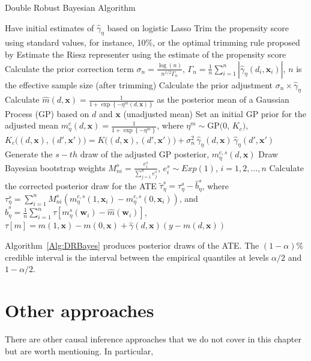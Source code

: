 \begin{algorithm}[h!]
	\caption{Double Robust Bayesian Algorithm}\label{Alg:DRBayes}
	\begin{algorithmic}[1]
		\State Have initial estimates of $\hat{\gamma}_{\eta}$ based on logistic Lasso
		\State Trim the propensity score using standard values, for instance, 10\%, or the optimal trimming rule proposed by \cite{Crump2009Overlap}
		\State Estimate the Riesz representer using the estimate of the propensity score 
		\State Calculate the prior correction term $\sigma_n=\frac{\log(n)}{n^{1/2}\Gamma_n}$, $\Gamma_n=\frac{1}{n}\sum_{i=1}^n |\hat{\gamma}_{\eta}(d_i,\mathbf{x}_i)|$, $n$ is the effective sample size (after trimming)
		\State Calculate the prior adjustment $\sigma_n\times \hat{\gamma}_{\eta}$ 
		\State Calculate $\hat{m}(d,\mathbf{x})=\frac{1}{1+\exp\left\{-\eta^m(d,\mathbf{x})\right\}}$ as the posterior mean of a Gaussian Process (GP) based on $d$ and $\mathbf{x}$ (unadjusted mean)
		\State Set an initial GP prior for  the adjusted mean $m_{\eta}^c(d,\mathbf{x})=\frac{1}{1+\exp\left\{-\eta^m\right\}}$, where $\eta^m \sim \mathrm{GP}\!\big(0,\, K_c\big)$, $K_c\big((d,\mathbf{x}),(d',\mathbf{x}')\big)
		= K\big((d,\mathbf{x}),(d',\mathbf{x}')\big)
		+ \sigma_n^2\,\widehat{\gamma}_\eta(d,\mathbf{x})\,
		\widehat{\gamma}_\eta(d',\mathbf{x}')$ 		 			
		\State Generate the $s-th$ draw of the adjusted GP posterior, $m_{\eta}^{c,s}(d,\mathbf{x})$
		\State Draw Bayesian bootstrap weights $M^s_{ni}=\frac{e_i^s}{\sum_{j=1}^n e_j^s}$, $e_i^s\sim Exp(1)$, $i=1,2,\dots,n$
		\State Calculate the corrected posterior draw for the ATE $\tilde{\tau}_{\eta}^s=\tau_{\eta}^s-\hat{b}_{\eta}^s$, where $\tau_{\eta}^s=\sum_{i=1}^n M^s_{ni}(m_{\eta}^{c,s}(1,\mathbf{x}_i)-m_{\eta}^{c,s}(0,\mathbf{x}_i))$, and $\hat{b}_{\eta}^s=\frac{1}{n}\sum_{i=1}^n\tau[m_{\eta}^s(\mathbf{w}_i)-\hat{m}(\mathbf{w}_i)]$, $\tau[m]=m(1,\mathbf{x})-m(0,\mathbf{x})+\hat{\gamma}(d,\mathbf{x})(y-m(d,\mathbf{x}))$ 
		\EndFor 
	\end{algorithmic} 
\end{algorithm}      
 
Algorithm~\ref{Alg:DRBayes} produces posterior draws of the ATE. The $(1-\alpha)\%$ credible interval is the interval between the empirical quantiles at levels $\alpha/2$ and $1-\alpha/2$.

\section{Other approaches}\label{sec12_12}
There are other causal inference approaches that we do not cover in this chapter but are worth mentioning. In particular, 

